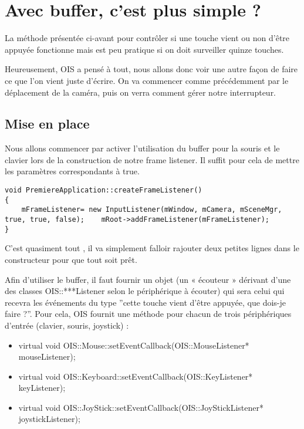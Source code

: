 \section{Avec buffer, c'est plus simple ?}

La m\'ethode pr\'esent\'ee ci-avant pour contr\^oler si une touche vient ou non d'\^etre appuy\'ee fonctionne mais est peu pratique si on doit surveiller quinze touches.

Heureusement, OIS a pens\'e \`a tout, nous allons donc voir une autre fa\c{c}on de faire ce que l'on vient juste d'\'ecrire. On va commencer comme pr\'ec\'edemment par le d\'eplacement de la cam\'era, puis on verra comment g\'erer notre interrupteur.


\subsection{Mise en place}


Nous allons commencer par activer l'utilisation du buffer pour la souris et le clavier lors de la construction de notre frame listener. Il suffit pour cela de mettre les param\`etres correspondants \`a true.


\begin{lstlisting}[caption={Activation du buffer pour la souris et le clavier}]
void PremiereApplication::createFrameListener()
{
    mFrameListener= new InputListener(mWindow, mCamera, mSceneMgr, true, true, false);    mRoot->addFrameListener(mFrameListener);
}
\end{lstlisting}


C'est quasiment tout , il va simplement falloir rajouter deux petites lignes dans le constructeur pour que tout soit pr\^et.

Afin d'utiliser le buffer, il faut fournir un objet (un « \'ecouteur » d\'erivant d'une des classes OIS::***Listener selon le p\'eriph\'erique \`a \'ecouter) qui sera celui qui recevra les \'ev\'enements du type ''cette touche vient d'\^etre appuy\'ee, que dois-je faire ?''. Pour cela, OIS fournit une m\'ethode pour chacun de trois p\'eriph\'eriques d'entr\'ee (clavier, souris, joystick) :


\begin{itemize}
\item  virtual void OIS::Mouse::setEventCallback(OIS::MouseListener* mouseListener);
\item  virtual void OIS::Keyboard::setEventCallback(OIS::KeyListener* keyListener);
\item  virtual void OIS::JoyStick::setEventCallback(OIS::JoyStickListener* joystickListener);
\end{itemize}

